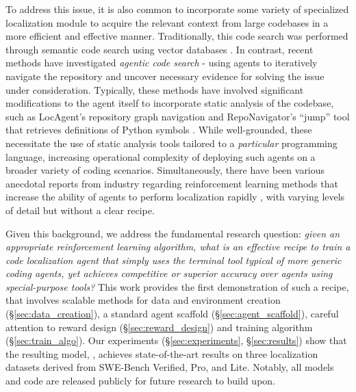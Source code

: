 To address this issue, it is also common to incorporate some variety of specialized localization module to acquire the relevant context from large codebases in a more efficient and effective manner.
Traditionally, this code search was performed through semantic code search using vector databases \citep{xia2024agentless,wang2025coderag}. In contrast, recent methods have investigated \emph{agentic code search} - using agents to iteratively navigate the repository and uncover necessary evidence for solving the issue under consideration.
Typically, these methods have involved significant modifications to the agent itself to incorporate static analysis of the codebase, such as LocAgent's repository graph navigation \citep{chen-etal-2025-locagent} and RepoNavigator's ``jump'' tool that retrieves definitions of Python symbols \citep{zhang2025one}.
While well-grounded, these necessitate the use of static analysis tools tailored to a \emph{particular} programming language, increasing operational complexity of deploying such agents on a broader variety of coding scenarios.
Simultaneously, there have been various anecdotal reports from industry regarding reinforcement learning methods that increase the ability of agents to perform localization rapidly \citep{cognition2025swegrep,cursor2025composer}, with varying levels of detail but without a clear recipe.

Given this background, we address the fundamental research question: \emph{given an appropriate reinforcement learning algorithm, what is an effective recipe to train a code localization agent that simply uses the terminal tool typical of more generic coding agents, yet achieves competitive or superior accuracy over agents using special-purpose tools?}
This work provides the first demonstration of such a recipe, that involves scalable methods for data and environment creation (\S\ref{sec:data_creation}), a standard agent scaffold (\S\ref{sec:agent_scaffold}), careful attention to reward design (\S\ref{sec:reward_design}) and training algorithm (\S\ref{sec:train_algo}).
Our experiments (\S\ref{sec:experiments}, \S\ref{sec:results}) show that the resulting model, \methodname, achieves state-of-the-art results on three localization datasets derived from SWE-Bench Verified, Pro, and Lite. Notably, all models and code are released publicly for future research to build upon.

